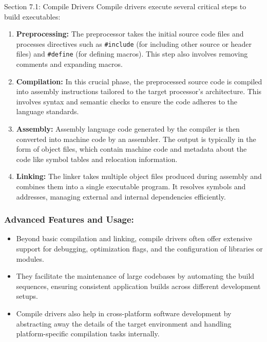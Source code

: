 \begin{notes}{Section 7.1: Compile Drivers}
    Compile drivers execute several critical steps to build executables:
    \begin{enumerate}
        \item \textbf{Preprocessing:} The preprocessor takes the initial source code files and processes directives such as \texttt{\#include} (for including other source or header files) and \texttt{\#define} 
        (for defining macros). This step also involves removing comments and expanding macros.
        \item \textbf{Compilation:} In this crucial phase, the preprocessed source code is compiled into assembly instructions tailored to the target processor's architecture. This involves syntax and semantic 
        checks to ensure the code adheres to the language standards.
        \item \textbf{Assembly:} Assembly language code generated by the compiler is then converted into machine code by an assembler. The output is typically in the form of object files, which contain 
        machine code and metadata about the code like symbol tables and relocation information.
        \item \textbf{Linking:} The linker takes multiple object files produced during assembly and combines them into a single executable program. It resolves symbols and addresses, managing external 
        and internal dependencies efficiently.
    \end{enumerate}
    
    \subsubsection*{Advanced Features and Usage:}
    
    \begin{itemize}
        \item Beyond basic compilation and linking, compile drivers often offer extensive support for debugging, optimization flags, and the configuration of libraries or modules.
        \item They facilitate the maintenance of large codebases by automating the build sequences, ensuring consistent application builds across different development setups.
        \item Compile drivers also help in cross-platform software development by abstracting away the details of the target environment and handling platform-specific compilation tasks internally.
    \end{itemize}
    

\end{notes}
